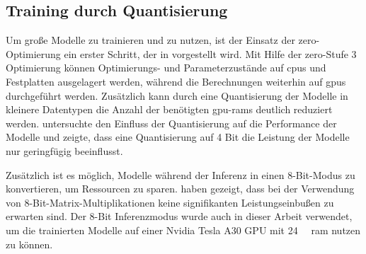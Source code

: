 \subsection{Training durch Quantisierung}
Um große Modelle zu trainieren und zu nutzen, ist der Einsatz der \ac{zero}-Optimierung ein erster Schritt, der in \citet{deepspeed} vorgestellt wird.
Mit Hilfe der \ac{zero}-Stufe 3 Optimierung können Optimierungs- und Parameterzustände auf \ac{cpu}s und Festplatten ausgelagert werden, während die Berechnungen weiterhin auf \ac{gpu}s durchgeführt werden.
Zusätzlich kann durch eine Quantisierung der Modelle in kleinere Datentypen die Anzahl der benötigten \ac{gpu}-\ac{ram}s deutlich reduziert werden.
\citet{4bit} untersuchte den Einfluss der Quantisierung auf die Performance der Modelle und zeigte, dass eine Quantisierung auf 4 Bit die Leistung der Modelle nur geringfügig beeinflusst.\\

Zusätzlich ist es möglich, Modelle während der Inferenz in einen 8-Bit-Modus zu konvertieren, um Ressourcen zu sparen.
\citet{8bit-inference} haben gezeigt, dass bei der Verwendung von 8-Bit-Matrix-Multiplikationen keine signifikanten Leistungseinbußen zu erwarten sind.
Der 8-Bit Inferenzmodus wurde auch in dieser Arbeit verwendet, um die trainierten Modelle auf einer Nvidia Tesla A30 GPU mit \SI{24}{\giga\byte} \ac{ram} nutzen zu können.\\

